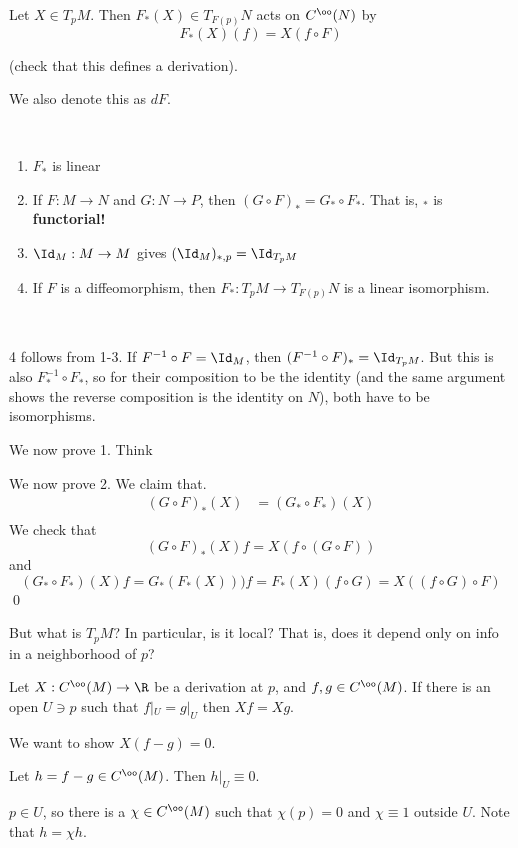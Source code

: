 \documentclass[x11names,reqno,14pt]{extarticle}
\begin{document}
Let $X \in T_pM$. Then $F_*(X) \in T_{F(p)}N$ acts on $C^\oo(N)$ by 
\[
F_*(X)(f) = X(f\circ F)
\]

(check that this defines a derivation).

We also denote this as $dF$.

\,
\begin{enumerate}

\item $F_*$ is linear

\item If $F:M\to N$ and $G:N\to P$, then $(G\circ F)_* = G_*\circ F_*$. That is, $_*$ is \textbf{functorial!}

\item $\Id_M:M\to M$ gives $(\Id_M)_{*,p} = \Id_{T_pM}$

\item If $F$ is a diffeomorphism, then $F_*:T_pM\to T_{F(p)}N$ is a linear isomorphism.

\end{enumerate}

\proof
\,

4 follows from 1-3. If $F^{-1}\circ F = \Id_M$, then $(F^{-1}\circ F)_* = \Id_{T_pM}$. But this is also $F^{-1}_* \circ F_*$, so for their composition to be the identity (and the same argument shows the reverse composition is the identity on $N$), both have to be isomorphisms. 

We now prove 1. Think

We now prove 2. We claim that.
\begin{align*}
(G\circ F)_*(X) & = (G_*\circ F_*)(X) \\
\end{align*}
We check that 
\[
(G\circ F)_*(X)f = X(f\circ(G\circ F))
\]
 and 
\[
(G_*\circ F_*)(X)f = G_*(F_*(X)))f = F_*(X)(f\circ G) = X((f\circ G) \circ F)
\]
\qed
\,

But what is $T_pM$? In particular, is it local? That is, does it depend only on info in a neighborhood of $p$? 

\prop

Let $X:C^\oo(M)\to \R$ be a derivation at $p$, and $f, g \in C^\oo(M)$. If there is an open $U \ni p$ such that $f|_U = g|_U$ then $Xf = Xg$. 

\proof

We want to show $X(f - g) = 0$. 

Let $h = f - g \in C^\oo(M)$. Then $h|_U \equiv 0$. 

$p \in U$, so there is a $\chi \in C^\oo(M)$ such that $\chi(p) = 0$ and $\chi \equiv 1$ outside $U$. Note that $h = \chi h$. 
\end{document}
